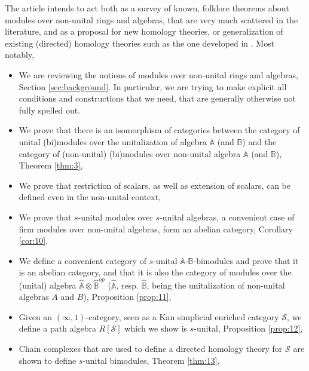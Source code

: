 \documentclass[a4paper,fleqn]{cas-sc}
\newcommand{\bA}{\mathbb{A}}
\newcommand{\bB}{\mathbb{B}}
\newcommand{\cS}{{\mathcal{S}}}
\begin{document}
The article intends to act both as a survey of known, folklore theorems about modules over non-unital rings and algebras, that are very much scattered in the literature, and as a proposal for new homology theories, or generalization of existing (directed) homology theories such as the one developed in \cite{eric}. Most notably,
\begin{itemize}
\item We are reviewing the notions of modules over non-unital rings and algebras, Section \ref{sec:background}. In particular, we are trying to make explicit all conditions and constructions that we need, that are generally otherwise not fully spelled out. %
\item We prove that there is an isomorphism of categories between the category of unital (bi)modules over the unitalization of algebra $\bA$ (and $\bB$) and the category of (non-unital) (bi)modules over non-unital algebra $\bA$ (and $\bB$), Theorem \ref{thm:3},
\item We prove that restriction of scalars, as well as extension of scalars, can be defined even in the non-unital context, 
\item We prove that $s$-unital modules over $s$-unital algebras, a convenient case of firm modules over non-unital algebras, form an abelian category, Corollary \ref{cor:10},
\item We define a convenient category of $s$-unital $\bA$-$\bB$-bimodules and prove that it is an abelian category, and that it is also the category of modules over the (unital) algebra $\hat{\bA}\otimes \hat{\bB}^{op}$ ($\hat{\bA}$, resp. $\hat{\bB}$, being the unitalization of non-unital algebras $A$ and $B$), Proposition \ref{prop:11}, %
\item Given an $(\infty,1)$-category, seen as a Kan simplicial enriched category $\cS$, we define a path algebra $R[\cS]$ which we show is $s$-unital, Proposition \ref{prop:12}, 
\item Chain complexes that are used to define a directed homology theory for $\cS$ are shown to define $s$-unital bimodules, Theorem \ref{thm:13},

\end{itemize}
\end{document}
